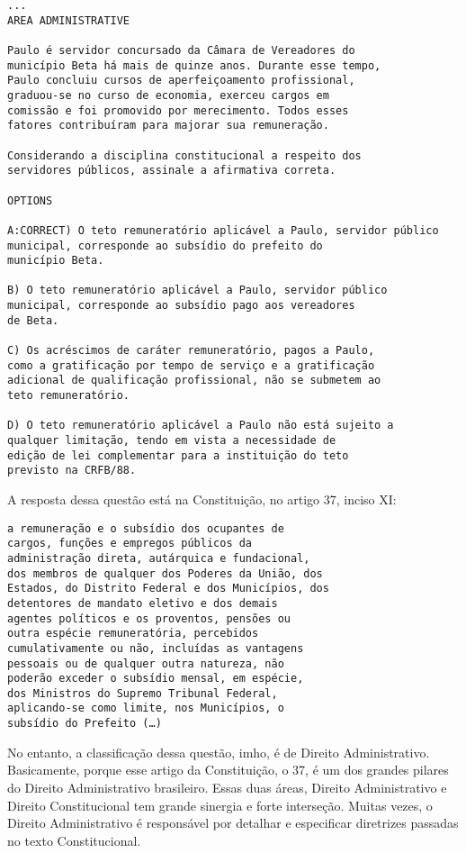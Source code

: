 \documentclass{article}
\begin{document}
\begin{verbatim}
...
AREA ADMINISTRATIVE

Paulo é servidor concursado da Câmara de Vereadores do 
município Beta há mais de quinze anos. Durante esse tempo, 
Paulo concluiu cursos de aperfeiçoamento profissional, 
graduou-se no curso de economia, exerceu cargos em 
comissão e foi promovido por merecimento. Todos esses 
fatores contribuíram para majorar sua remuneração. 
 
Considerando a disciplina constitucional a respeito dos 
servidores públicos, assinale a afirmativa correta. 
 
OPTIONS

A:CORRECT) O teto remuneratório aplicável a Paulo, servidor público 
municipal, corresponde ao subsídio do prefeito do 
município Beta. 

B) O teto remuneratório aplicável a Paulo, servidor público 
municipal, corresponde ao subsídio pago aos vereadores 
de Beta. 

C) Os acréscimos de caráter remuneratório, pagos a Paulo, 
como a gratificação por tempo de serviço e a gratificação 
adicional de qualificação profissional, não se submetem ao 
teto remuneratório. 

D) O teto remuneratório aplicável a Paulo não está sujeito a 
qualquer limitação, tendo em vista a necessidade de 
edição de lei complementar para a instituição do teto 
previsto na CRFB/88. 
\end{verbatim}

A resposta dessa questão está na Constituição, no artigo 37, inciso XI:


\begin{verbatim}
a remuneração e o subsídio dos ocupantes de
cargos, funções e empregos públicos da
administração direta, autárquica e fundacional,
dos membros de qualquer dos Poderes da União, dos
Estados, do Distrito Federal e dos Municípios, dos
detentores de mandato eletivo e dos demais
agentes políticos e os proventos, pensões ou
outra espécie remuneratória, percebidos
cumulativamente ou não, incluídas as vantagens 
pessoais ou de qualquer outra natureza, não 
poderão exceder o subsídio mensal, em espécie, 
dos Ministros do Supremo Tribunal Federal, 
aplicando-se como limite, nos Municípios, o 
subsídio do Prefeito (…)
\end{verbatim} 

No entanto, a classificação dessa questão, imho, é de Direito
Administrativo. Basicamente, porque esse artigo da Constituição, o 37,
é um dos grandes pilares do Direito Administrativo brasileiro. Essas
duas áreas, Direito Administrativo e Direito Constitucional tem grande
sinergia e forte interseção. Muitas vezes, o Direito Administrativo é
responsável por detalhar e especificar diretrizes passadas no texto
Constitucional.
\end{document}
